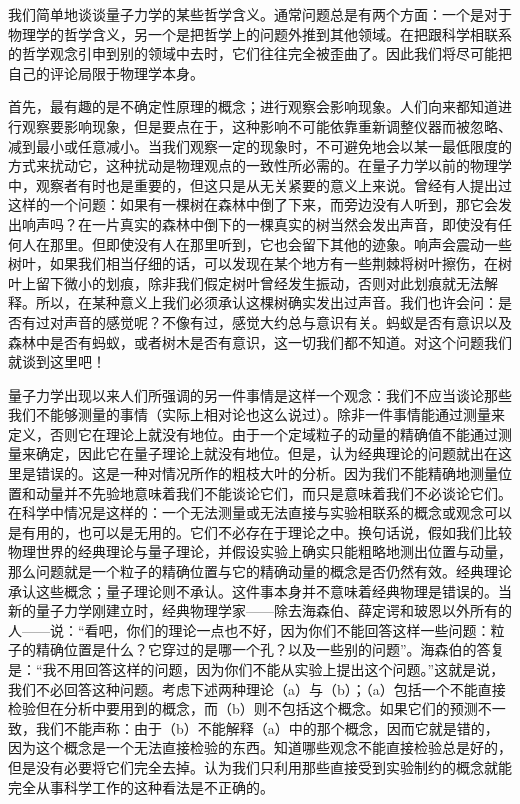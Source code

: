 我们简单地谈谈量子力学的某些哲学含义。通常问题总是有两个方面：一个是对于物理学的哲学含义，另一个是把哲学上的问题外推到其他领域。在把跟科学相联系的哲学观念引申到别的领域中去时，它们往往完全被歪曲了。因此我们将尽可能把自己的评论局限于物理学本身。

首先，最有趣的是不确定性原理的概念；进行观察会影响现象。人们向来都知道进行观察要影响现象，但是要点在于，这种影响不可能依靠重新调整仪器而被忽略、减到最小或任意减小。当我们观察一定的现象时，不可避免地会以某一最低限度的方式来扰动它，这种扰动是物理观点的一致性所必需的。在量子力学以前的物理学中，观察者有时也是重要的，但这只是从无关紧要的意义上来说。曾经有人提出过这样的一个问题：如果有一棵树在森林中倒了下来，而旁边没有人听到，那它会发出响声吗？在一片真实的森林中倒下的一棵真实的树当然会发出声音，即使没有任何人在那里。但即使没有人在那里听到，它也会留下其他的迹象。响声会震动一些树叶，如果我们相当仔细的话，可以发现在某个地方有一些荆棘将树叶擦伤，在树叶上留下微小的划痕，除非我们假定树叶曾经发生振动，否则对此划痕就无法解释。所以，在某种意义上我们必须承认这棵树确实发出过声音。我们也许会问：是否有过对声音的感觉呢？不像有过，感觉大约总与意识有关。蚂蚁是否有意识以及森林中是否有蚂蚁，或者树木是否有意识，这一切我们都不知道。对这个问题我们就谈到这里吧！

量子力学出现以来人们所强调的另一件事情是这样一个观念：我们不应当谈论那些我们不能够测量的事情（实际上相对论也这么说过）。除非一件事情能通过测量来定义，否则它在理论上就没有地位。由于一个定域粒子的动量的精确值不能通过测量来确定，因此它在量子理论上就没有地位。但是，认为经典理论的问题就出在这里是错误的。这是一种对情况所作的粗枝大叶的分析。因为我们不能精确地测量位置和动量并不先验地意味着我们不能谈论它们，而只是意味着我们不必谈论它们。在科学中情况是这样的：一个无法测量或无法直接与实验相联系的概念或观念可以是有用的，也可以是无用的。它们不必存在于理论之中。换句话说，假如我们比较物理世界的经典理论与量子理论，并假设实验上确实只能粗略地测出位置与动量，那么问题就是一个粒子的精确位置与它的精确动量的概念是否仍然有效。经典理论承认这些概念；量子理论则不承认。这件事本身并不意味着经典物理是错误的。当新的量子力学刚建立时，经典物理学家——除去海森伯、薛定谔和玻恩以外所有的人——说：“看吧，你们的理论一点也不好，因为你们不能回答这样一些问题：粒子的精确位置是什么？它穿过的是哪一个孔？以及一些别的问题”。海森伯的答复是：“我不用回答这样的问题，因为你们不能从实验上提出这个问题。”这就是说，我们不必回答这种问题。考虑下述两种理论（a）与（b）；（a）包括一个不能直接检验但在分析中要用到的概念，而（b）则不包括这个概念。如果它们的预测不一致，我们不能声称：由于（b）不能解释（a）中的那个概念，因而它就是错的，因为这个概念是一个无法直接检验的东西。知道哪些观念不能直接检验总是好的，但是没有必要将它们完全去掉。认为我们只利用那些直接受到实验制约的概念就能完全从事科学工作的这种看法是不正确的。

